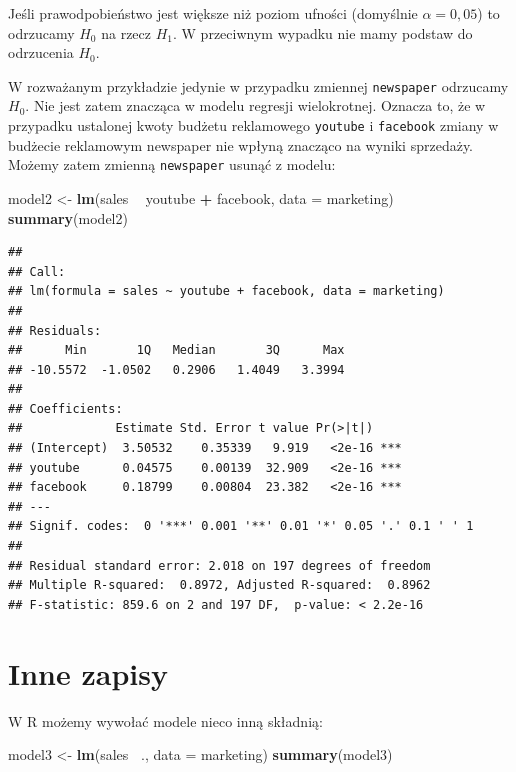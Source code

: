 \documentclass[]{article}
\newenvironment{Shaded}{\begin{snugshade}}{\end{snugshade}}
\newcommand{\KeywordTok}[1]{\textcolor[rgb]{0.13,0.29,0.53}{\textbf{#1}}}
\newcommand{\DataTypeTok}[1]{\textcolor[rgb]{0.13,0.29,0.53}{#1}}
\newcommand{\StringTok}[1]{\textcolor[rgb]{0.31,0.60,0.02}{#1}}
\newcommand{\OperatorTok}[1]{\textcolor[rgb]{0.81,0.36,0.00}{\textbf{#1}}}
\newcommand{\NormalTok}[1]{#1}
\begin{document}
Jeśli prawodpobieństwo jest większe niż poziom ufności (domyślnie
\(\alpha=0,05\)) to odrzucamy \(H_0\) na rzecz \(H_1\). W przeciwnym
wypadku nie mamy podstaw do odrzucenia \(H_0\).

W rozważanym przykładzie jedynie w przypadku zmiennej \texttt{newspaper}
odrzucamy \(H_0\). Nie jest zatem znacząca w modelu regresji
wielokrotnej. Oznacza to, że w przypadku ustalonej kwoty budżetu
reklamowego \texttt{youtube} i \texttt{facebook} zmiany w budżecie
reklamowym newspaper nie wpłyną znacząco na wyniki sprzedaży. Możemy
zatem zmienną \texttt{newspaper} usunąć z modelu:

\begin{Shaded}
\begin{Highlighting}[]
\NormalTok{model2  <-}\StringTok{ }\KeywordTok{lm}\NormalTok{(sales }\OperatorTok{~}\StringTok{ }\NormalTok{youtube }\OperatorTok{+}\StringTok{ }\NormalTok{facebook, }\DataTypeTok{data =}\NormalTok{ marketing)}
\KeywordTok{summary}\NormalTok{(model2)}
\end{Highlighting}
\end{Shaded}

\begin{verbatim}
## 
## Call:
## lm(formula = sales ~ youtube + facebook, data = marketing)
## 
## Residuals:
##      Min       1Q   Median       3Q      Max 
## -10.5572  -1.0502   0.2906   1.4049   3.3994 
## 
## Coefficients:
##             Estimate Std. Error t value Pr(>|t|)    
## (Intercept)  3.50532    0.35339   9.919   <2e-16 ***
## youtube      0.04575    0.00139  32.909   <2e-16 ***
## facebook     0.18799    0.00804  23.382   <2e-16 ***
## ---
## Signif. codes:  0 '***' 0.001 '**' 0.01 '*' 0.05 '.' 0.1 ' ' 1
## 
## Residual standard error: 2.018 on 197 degrees of freedom
## Multiple R-squared:  0.8972, Adjusted R-squared:  0.8962 
## F-statistic: 859.6 on 2 and 197 DF,  p-value: < 2.2e-16
\end{verbatim}

\section{Inne zapisy}\label{inne-zapisy}

W R możemy wywołać modele nieco inną składnią:

\begin{Shaded}
\begin{Highlighting}[]
\NormalTok{model3 <-}\StringTok{ }\KeywordTok{lm}\NormalTok{(sales }\OperatorTok{~}\NormalTok{., }\DataTypeTok{data =}\NormalTok{ marketing)}
\KeywordTok{summary}\NormalTok{(model3)}
\end{Highlighting}
\end{Shaded}
\end{document}
